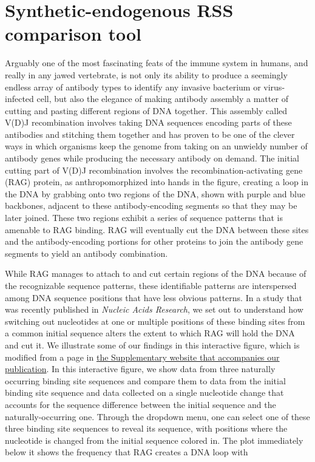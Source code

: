 \documentclass[11pt, oneside]{article}   	%
\begin{document}
\section*{Synthetic-endogenous RSS comparison tool}
\author{Griffin Chure, Soichi Hirokawa}

Arguably one of the most fascinating feats of the immune system in humans, and really in any jawed vertebrate, is not only
its ability to produce a seemingly endless array of antibody types to identify any invasive bacterium or virus-infected cell,
but also the elegance of making antibody assembly a matter of cutting and pasting different regions of DNA together. This
assembly called V(D)J recombination involves taking DNA sequences encoding parts of these antibodies and stitching them
together and has proven to be one of the clever ways in which organisms keep the genome from taking on an unwieldy 
number of antibody genes while producing the necessary antibody on demand. The initial cutting part of V(D)J recombination 
involves the recombination-activating gene (RAG) protein, as anthropomorphized into hands in the figure, creating a loop 
in the DNA by grabbing onto two regions of the DNA, shown with purple and blue backbones, adjacent to these 
antibody-encoding segments so that they may be later joined. These two regions exhibit a series of sequence patterns 
that is amenable to RAG binding. RAG will eventually cut the DNA between these sites and the antibody-encoding portions
for other proteins to join the antibody gene segments to yield an antibody combination.

While RAG manages to attach to and cut certain regions of the DNA because of the recognizable sequence patterns, these
identifiable patterns are interspersed among DNA sequence positions that have less obvious patterns. In a study that was 
recently published in \emph{Nucleic Acids Research}, we set out to understand how switching out nucleotides at one or
multiple positions of these binding sites from a common initial sequence alters the extent to which RAG will hold the 
DNA and cut it. We illustrate some of our findings in this interactive figure, which is modified from a page in 
\href{https://www.rpgroup.caltech.edu/vdj_recombination}{the Supplementary website that accompanies our publication}. 
In this interactive figure, we show data from three naturally occurring binding site sequences and compare them to
data from the initial binding site sequence and data collected on a single nucleotide change that accounts for the sequence
difference between the initial sequence and the naturally-occurring one. Through the dropdown menu, one can select
one of these three binding site sequences to reveal its sequence, with positions where the nucleotide is changed from
the initial sequence colored in. The plot immediately below it shows the frequency that RAG creates a DNA loop with
\end{document}
